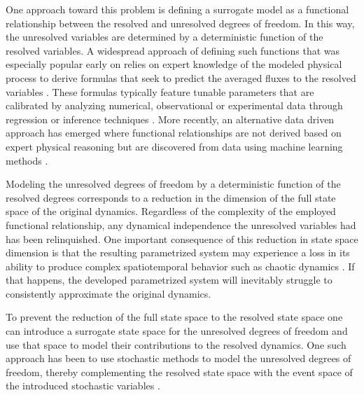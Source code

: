 \documentclass[letterpaper,10pt,3p,preprint]{elsarticle}
\begin{document}
One approach toward this problem is defining a surrogate model
as a functional relationship between the resolved and unresolved
degrees of freedom.
In this way, the unresolved variables are determined by a
deterministic function of the resolved variables.
A widespread approach of defining such functions that was
especially popular early on relies on expert knowledge of the
modeled physical process to derive formulas that seek to predict
the averaged fluxes to the resolved variables
\cite{Stensrud2013}.
These formulas typically feature tunable parameters
that are calibrated by analyzing numerical, observational
or experimental data through regression or inference techniques
\cite{Neelin2010,Kondrashov2015,Schneider2017,NChen2019}.
More recently, an alternative data driven approach has emerged
where functional relationships are not derived based on
expert physical reasoning but are discovered from data using
machine learning methods
\cite{Brenowitz2018,Pan2018,Rasp2018,BarSinai2019,
Bolton2019,Raissi2019,Lee2020,Yuval2020,Bhattacharya2021,
Bae2022,Charalampopoulos2022,DQi2022,Bracco2025}.

Modeling the unresolved degrees of freedom by a deterministic
function of the resolved degrees corresponds to a reduction in
the dimension of the full state space of the original dynamics.
Regardless of the complexity of the employed functional
relationship, any dynamical independence the unresolved variables
had has been relinquished.
One important consequence of this reduction in state space
dimension is that the resulting parametrized system may
experience a loss in its ability to produce complex
spatiotemporal behavior such as chaotic dynamics
\cite{Palmer2001}.
If that happens, the developed parametrized system will
inevitably struggle to consistently approximate the original
dynamics.

To prevent the reduction of the full state space to the resolved
state space one can introduce a surrogate state space for the
unresolved degrees of freedom and use that space to model their
contributions to the resolved dynamics.
One such approach has been to use stochastic methods to model the
unresolved degrees of freedom, thereby complementing the resolved
state space with the event space of the introduced stochastic
variables
\cite{Majda1999,Crommelin2008,Pavliotis2008,Chorin2015,Berner2017,
Gottwald2017}.
\end{document}
